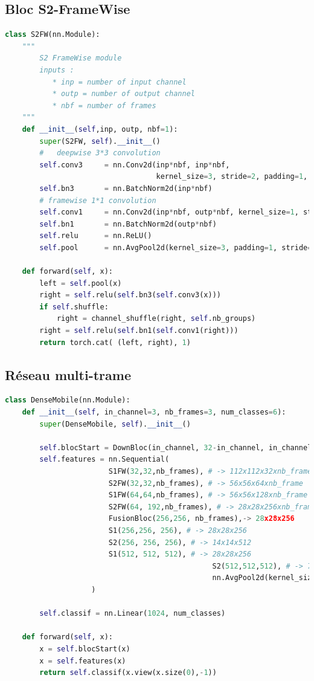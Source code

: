 \subsection{Bloc S2-FrameWise}
\label{sec:implementationS2}

\begin{lstlisting}[language=Python]
class S2FW(nn.Module):
    """
        S2 FrameWise module
        inputs : 
           * inp = number of input channel
           * outp = number of output channel
           * nbf = number of frames
    """
    def __init__(self,inp, outp, nbf=1):
        super(S2FW, self).__init__()
        #	deepwise 3*3 convolution 
        self.conv3     = nn.Conv2d(inp*nbf, inp*nbf, 
                                   kernel_size=3, stride=2, padding=1, groups=inp*nbf)
        self.bn3       = nn.BatchNorm2d(inp*nbf)
        # framewise 1*1 convolution
        self.conv1     = nn.Conv2d(inp*nbf, outp*nbf, kernel_size=1, stride=1, padding=0, groups=nbf)
        self.bn1       = nn.BatchNorm2d(outp*nbf)
        self.relu      = nn.ReLU()
        self.pool      = nn.AvgPool2d(kernel_size=3, padding=1, stride=2)
        
    def forward(self, x):
        left = self.pool(x)
        right = self.relu(self.bn3(self.conv3(x)))
        if self.shuffle:
            right = channel_shuffle(right, self.nb_groups)
        right = self.relu(self.bn1(self.conv1(right)))
        return torch.cat( (left, right), 1)
\end{lstlisting}


\subsection{Réseau multi-trame}
\label{sec:implementationRMF}


\begin{lstlisting}[language=Python]
class DenseMobile(nn.Module):
    def __init__(self, in_channel=3, nb_frames=3, num_classes=6):
        super(DenseMobile, self).__init__()

        self.blocStart = DownBloc(in_channel, 32-in_channel, in_channel, nb_frames=nb_frames) #224x224x3 -> 112x112x32
        self.features = nn.Sequential(
                        S1FW(32,32,nb_frames), # -> 112x112x32xnb_frame
                        S2FW(32,32,nb_frames), # -> 56x56x64xnb_frame
                        S1FW(64,64,nb_frames), # -> 56x56x128xnb_frame
                        S2FW(64, 192,nb_frames), # -> 28x28x256xnb_frame
                        FusionBloc(256,256, nb_frames),-> 28x28x256
                        S1(256,256, 256), # -> 28x28x256
                        S2(256, 256, 256), # -> 14x14x512
                        S1(512, 512, 512), # -> 28x28x256
												S2(512,512,512), # -> 7x7x1024
												nn.AvgPool2d(kernel_size=7, padding=0, stride=1), #3x3
                    )
        
        self.classif = nn.Linear(1024, num_classes)
        
    def forward(self, x):
        x = self.blocStart(x)
        x = self.features(x)
        return self.classif(x.view(x.size(0),-1))
\end{lstlisting}


